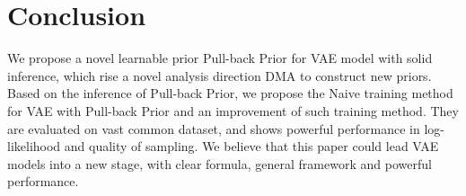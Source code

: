 \section{Conclusion}

We propose a novel learnable prior Pull-back Prior for VAE model with solid inference, which rise a novel analysis direction DMA to construct new priors. Based on the inference of Pull-back Prior, we propose the Naive training method for VAE with Pull-back Prior and an improvement of such training method. They are evaluated  on vast common dataset, and shows powerful performance in log-likelihood and quality of sampling. We believe that this paper could lead VAE models into a new stage, with clear formula, general framework and powerful performance. 